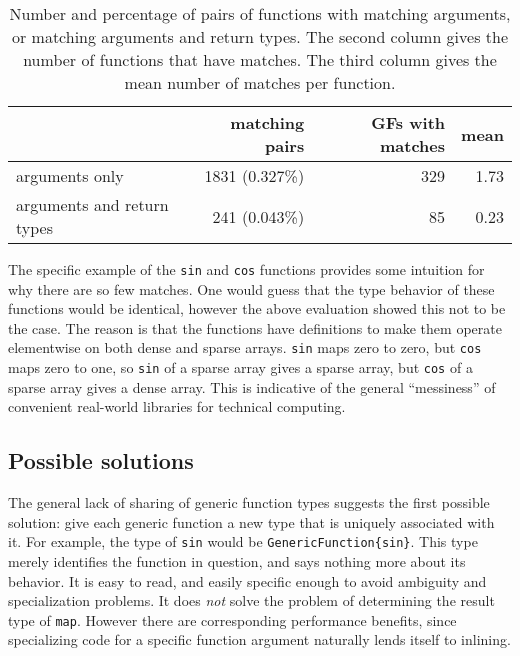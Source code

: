 \begin{table}
  \begin{center}
    \begin{tabular}{|l|r|r|r|}\hline
    &  \textbf{matching pairs} & \textbf{GFs with matches} & \textbf{mean} \\
      \hline \hline
arguments only             & 1831 (0.327\%)  &   329       &          1.73 \\
\hline
arguments and return types &  241 (0.043\%)  &   85        &          0.23 \\
\hline
\end{tabular}
\end{center}
  \caption[Sharing of function types]{
\small{
    Number and percentage of pairs of functions with matching arguments, or
    matching arguments and return types. The second column gives the number of
    functions that have matches. The third column gives the
    mean number of matches per function.
}
  }
  \label{tab:matchingfuncs}
\end{table}

The specific example of the \texttt{sin} and \texttt{cos} functions provides
some intuition for why there are so few matches.
One would guess that the type behavior of these functions would be identical,
however the above evaluation showed this not to be the case.
The reason is that the functions have definitions to make them operate
elementwise on both dense and sparse arrays.
\texttt{sin} maps zero to zero, but \texttt{cos} maps zero to one,
so \texttt{sin} of a sparse array gives a sparse array, but
\texttt{cos} of a sparse array gives a dense array.
This is indicative of the general ``messiness'' of convenient real-world
libraries for technical computing.


\subsection{Possible solutions}
\label{sec:nominalarrows}

The general lack of sharing of generic function types suggests the first
possible solution: give each generic function a new type that is uniquely
associated with it. For example, the type of \texttt{sin} would be
\texttt{GenericFunction\{sin\}}. This type merely identifies the function
in question, and says nothing more about its behavior. It is easy to read,
and easily specific enough to avoid ambiguity and specialization
problems. It does \emph{not} solve the problem of
determining the result type of \texttt{map}. However there are
corresponding performance benefits, since specializing code for a
specific function argument naturally lends itself to inlining.

